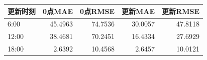\begin{tabular}{lrrrr}
\toprule
更新时刻 & 0点MAE & 0点RMSE & 更新MAE & 更新RMSE \\
\midrule
6:00 & 45.4963 & 74.7536 & 30.0057 & 47.8118 \\
12:00 & 38.4681 & 70.2451 & 16.4334 & 27.6929 \\
18:00 & 2.6392 & 10.4568 & 2.6457 & 10.0121 \\
\bottomrule
\end{tabular}
